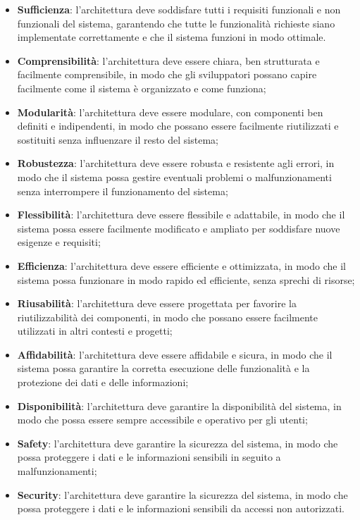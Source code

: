 \begin{itemize}
	\item \textbf{Sufficienza}: l'architettura deve soddisfare tutti i requisiti funzionali e non funzionali del sistema, garantendo che tutte le funzionalità richieste siano implementate correttamente e che il sistema funzioni in modo ottimale.
	\item \textbf{Comprensibilità}: l'architettura deve essere chiara, ben strutturata e facilmente comprensibile, in modo che gli sviluppatori possano capire facilmente come il sistema è organizzato e come funziona;
	\item \textbf{Modularità}: l'architettura deve essere modulare, con componenti ben definiti e indipendenti, in modo che possano essere facilmente riutilizzati e sostituiti senza influenzare il resto del sistema;
	\item \textbf{Robustezza}: l'architettura deve essere robusta e resistente agli errori, in modo che il sistema possa gestire eventuali problemi o malfunzionamenti senza interrompere il funzionamento del sistema;
	\item \textbf{Flessibilità}: l'architettura deve essere flessibile e adattabile, in modo che il sistema possa essere facilmente modificato e ampliato per soddisfare nuove esigenze e requisiti;
	\item \textbf{Efficienza}: l'architettura deve essere efficiente e ottimizzata, in modo che il sistema possa funzionare in modo rapido ed efficiente, senza sprechi di risorse;
	\item \textbf{Riusabilità}: l'architettura deve essere progettata per favorire la riutilizzabilità dei componenti, in modo che possano essere facilmente utilizzati in altri contesti e progetti;
	\item \textbf{Affidabilità}: l'architettura deve essere affidabile e sicura, in modo che il sistema possa garantire la corretta esecuzione delle funzionalità e la protezione dei dati e delle informazioni;
	\item \textbf{Disponibilità}: l'architettura deve garantire la disponibilità del sistema, in modo che possa essere sempre accessibile e operativo per gli utenti;
	\item \textbf{Safety}: l'architettura deve garantire la sicurezza del sistema, in modo che possa proteggere i dati e le informazioni sensibili in seguito a malfunzionamenti;
	\item \textbf{Security}: l'architettura deve garantire la sicurezza del sistema, in modo che possa proteggere i dati e le informazioni sensibili da accessi non autorizzati.

\end{itemize}
